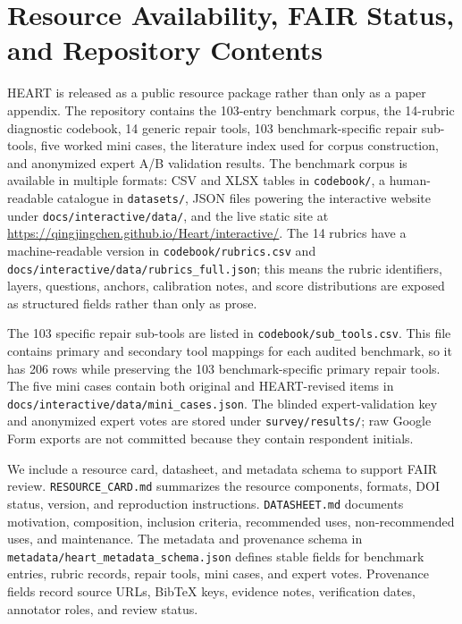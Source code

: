 \section{Resource Availability, FAIR Status, and Repository Contents}
\label{sec:resource-availability}

HEART is released as a public resource package rather than only as a paper
appendix. The repository contains the 103-entry benchmark corpus, the
14-rubric diagnostic codebook, 14 generic repair tools, 103
benchmark-specific repair sub-tools, five worked mini cases, the literature
index used for corpus construction, and anonymized expert A/B validation
results. The benchmark corpus is available in multiple formats:
CSV and XLSX tables in \texttt{codebook/}, a human-readable catalogue in
\texttt{datasets/}, JSON files powering the interactive website under
\texttt{docs/interactive/data/}, and the live static site at
\url{https://qingjingchen.github.io/Heart/interactive/}. The 14 rubrics have a
machine-readable version in \texttt{codebook/rubrics.csv} and
\texttt{docs/interactive/data/rubrics\_full.json}; this means the rubric
identifiers, layers, questions, anchors, calibration notes, and score
distributions are exposed as structured fields rather than only as prose.

The 103 specific repair sub-tools are listed in
\texttt{codebook/sub\_tools.csv}. This file contains primary and secondary
tool mappings for each audited benchmark, so it has 206 rows while preserving
the 103 benchmark-specific primary repair tools. The five mini cases contain
both original and HEART-revised items in
\texttt{docs/interactive/data/mini\_cases.json}. The blinded expert-validation
key and anonymized expert votes are stored under \texttt{survey/results/}; raw
Google Form exports are not committed because they contain respondent initials.

We include a resource card, datasheet, and metadata schema to support FAIR
review. \texttt{RESOURCE\_CARD.md} summarizes the resource components,
formats, DOI status, version, and reproduction instructions.
\texttt{DATASHEET.md} documents motivation, composition, inclusion criteria,
recommended uses, non-recommended uses, and maintenance. The metadata and
provenance schema in \texttt{metadata/heart\_metadata\_schema.json} defines
stable fields for benchmark entries, rubric records, repair tools, mini cases,
and expert votes. Provenance fields record source URLs, BibTeX keys, evidence
notes, verification dates, annotator roles, and review status.


